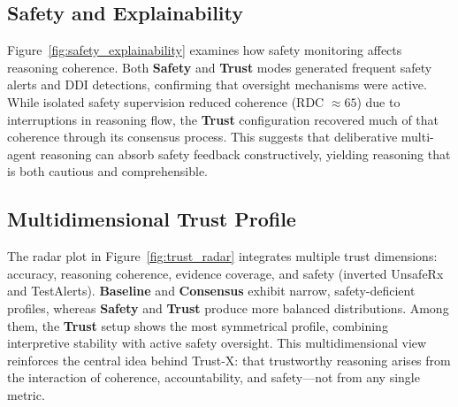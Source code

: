 \documentclass[letterpaper]{article} %
\begin{document}
\subsection{Safety and Explainability}
Figure~\ref{fig:safety_explainability} examines how safety monitoring affects reasoning coherence.  
Both \textbf{Safety} and \textbf{Trust} modes generated frequent safety alerts and DDI detections, confirming that oversight mechanisms were active.  
While isolated safety supervision reduced coherence (RDC $\approx65$) due to interruptions in reasoning flow, the \textbf{Trust} configuration recovered much of that coherence through its consensus process.  
This suggests that deliberative multi-agent reasoning can absorb safety feedback constructively, yielding reasoning that is both cautious and comprehensible.

\subsection{Multidimensional Trust Profile}
The radar plot in Figure~\ref{fig:trust_radar} integrates multiple trust dimensions: accuracy, reasoning coherence, evidence coverage, and safety (inverted UnsafeRx and TestAlerts).  
\textbf{Baseline} and \textbf{Consensus} exhibit narrow, safety-deficient profiles, whereas \textbf{Safety} and \textbf{Trust} produce more balanced distributions.  
Among them, the \textbf{Trust} setup shows the most symmetrical profile, combining interpretive stability with active safety oversight.  
This multidimensional view reinforces the central idea behind Trust-X: that trustworthy reasoning arises from the interaction of coherence, accountability, and safety—not from any single metric.
\end{document}
